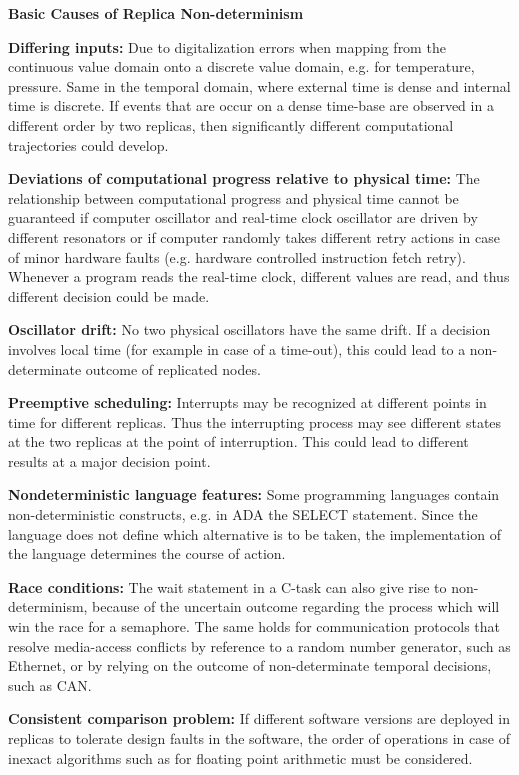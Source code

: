 \textbf{Basic Causes of Replica Non-determinism}

\textbf{Differing inputs:} Due to digitalization errors when mapping
from the continuous value domain onto a discrete value domain, e.g. for
temperature, pressure. Same in the temporal domain, where external time
is dense and internal time is discrete. If events that are occur on a
dense time-base are observed in a different order by two replicas, then
significantly different computational trajectories could develop.

\textbf{Deviations of computational progress relative to physical time:}
The relationship between computational progress and physical time cannot
be guaranteed if computer oscillator and real-time clock oscillator are
driven by different resonators or if computer randomly takes different
retry actions in case of minor hardware faults (e.g. hardware controlled
instruction fetch retry). Whenever a program reads the real-time clock,
different values are read, and thus different decision could be made.

\textbf{Oscillator drift:} No two physical oscillators have the same
drift. If a decision involves local time (for example in case of a
time-out), this could lead to a non-determinate outcome of replicated
nodes.

\textbf{Preemptive scheduling:} Interrupts may be recognized at
different points in time for different replicas. Thus the interrupting
process may see different states at the two replicas at the point of
interruption. This could lead to different results at a major decision
point.

\textbf{Nondeterministic language features:} Some programming languages
contain non-deterministic constructs, e.g. in ADA the SELECT statement.
Since the language does not define which alternative is to be taken, the
implementation of the language determines the course of action.

\textbf{Race conditions:} The wait statement in a C-task can also give
rise to non-determinism, because of the uncertain outcome regarding the
process which will win the race for a semaphore. The same holds for
communication protocols that resolve media-access conflicts by reference
to a random number generator, such as Ethernet, or by relying on the
outcome of non-determinate temporal decisions, such as CAN.

\textbf{Consistent comparison problem:} If different software versions
are deployed in replicas to tolerate design faults in the software, the
order of operations in case of inexact algorithms such as for floating
point arithmetic must be considered.

